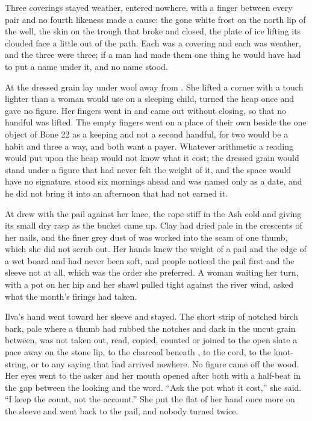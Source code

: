 Three coverings stayed weather, entered nowhere, with a finger between every pair and no fourth likeness made a cause: the gone white frost on the north lip of the well, the skin on the trough that broke and closed, the plate of ice lifting its clouded face a little out of the path. Each was a covering and each was weather, and the three were three; if a man had made them one thing he would have had to put a name under it, and no name stood.

At  the dressed grain lay under wool away from . She lifted a corner with a touch lighter than a woman would use on a sleeping child, turned the heap once and gave no figure. Her fingers went in and came out without closing, so that no handful was lifted. The empty fingers went on a place of their own beside the one object of Bone 22 as a keeping and not a second handful, for two would be a habit and three a way, and both want a payer. Whatever arithmetic a reading would put upon the heap would not know what it cost; the dressed grain would stand under a figure that had never felt the weight of it, and the space would have no signature.  stood six mornings ahead and was named only as a date, and he did not bring it into an afternoon that had not earned it.

At   drew with the pail against her knee, the rope stiff in the Ash cold and giving its small dry rasp as the bucket came up. Clay had dried pale in the crescents of her nails, and the finer grey dust of  was worked into the seam of one thumb, which she did not scrub out. Her hands knew the weight of a pail and the edge of a wet board and had never been soft, and people noticed the pail first and the sleeve not at all, which was the order she preferred. A woman waiting her turn, with a pot on her hip and her shawl pulled tight against the river wind, asked what the month’s firings had taken.

Ilva’s hand went toward her sleeve and stayed. The short strip of notched birch bark, pale where a thumb had rubbed the notches and dark in the uncut grain between, was not taken out, read, copied, counted or joined to the open slate a pace away on the stone lip, to the charcoal beneath , to the cord, to the knot-string, or to any saying that had arrived nowhere. No figure came off the wood. Her eyes went to the asker and her mouth opened after both with a half-beat in the gap between the looking and the word. “Ask the pot what it cost,” she said. “I keep the count, not the account.” She put the flat of her hand once more on the sleeve and went back to the pail, and nobody turned twice.

